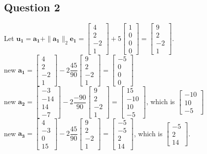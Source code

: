 \documentclass{article}
\newcommand{\bmat}[1]{\begin{bmatrix} #1 \end{bmatrix}}
\newcommand{\mat}[1]{\mathbf{#1}}
\begin{document}
\subsection*{Question 2}
Let $\mat{u_1} = \mat{a_1}+\|\mat{a_1}\|_2\mat{e_1} = \bmat{4\\2\\-2\\1} + 5\bmat{1\\0\\0\\0} = \bmat{9\\2\\-2\\1}$.\\
new $\mat{a_1} = \bmat{4\\2\\-2\\1} -2 \dfrac{45}{90} \bmat{9\\2\\-2\\1} = \bmat{-5\\0\\0\\0} $\\
new $\mat{a_2} = \bmat{-3\\-14\\14\\-7}- 2 \dfrac{-90}{90}\bmat{9\\2\\-2\\1} =\bmat{15\\-10\\10\\-5}$, which is
$\bmat{-10\\10\\-5}$\\
new  $\mat{a_3} = \bmat{4\\-3\\0\\15}- 2 \dfrac{45}{90}\bmat{9\\2\\-2\\1} =\bmat{-5\\-5\\2\\14}$, which is $\bmat{-5\\2\\14}$.
\end{document}
